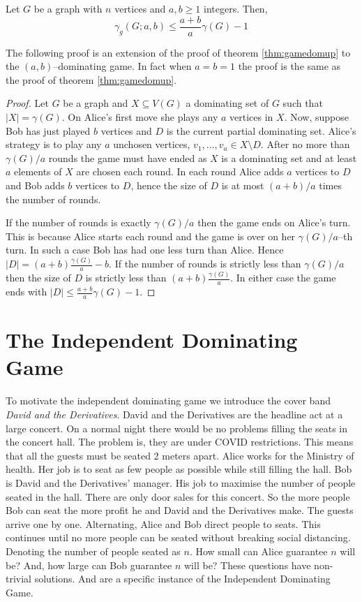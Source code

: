 \begin{theorem}[Askes] 
    Let $G$ be a graph with $n$ vertices and $a,b\geq1$ integers. Then,
    \[\gamma_{g}(G;a,b) \leq \frac{a+b}{a}\gamma(G) - 1\]
\end{theorem}
    The following proof is an extension of the proof of theorem \ref{thm:gamedomup} to the $(a,b)$--dominating game. In fact when $a=b=1$ the proof is the same as the proof of theorem \ref{thm:gamedomup}.
\begin{proof}    
   Let $G$ be a graph and $X\subseteq V(G)$ a dominating set of $G$ such that $|X| = \gamma(G)$. On Alice's first move she plays any $a$ vertices in $X$. Now, suppose Bob has just played $b$ vertices and $D$ is the current partial dominating set. Alice's strategy is to play any $a$ unchosen vertices, $v_1,\dots,v_a \in X\setminus D$. After no more than $\gamma(G)/a$ rounds the game must have ended as $X$ is a dominating set and at least $a$ elements of $X$ are chosen each round. In each round Alice adds $a$ vertices to $D$ and Bob adds $b$ vertices to $D$, hence the size of $D$ is at most $(a+b)/a$ times the number of rounds. 
   
   If the number of rounds is exactly $\gamma(G)/a$ then the game ends on Alice's turn. This is because Alice starts each round and the game is over on her $\gamma(G)/a$--th turn. In such a case Bob has had one less turn than Alice. Hence $|D|=(a+b)\frac{\gamma(G)}{a} -b$. If the number of rounds is strictly less than $\gamma(G)/a$ then the size of $D$ is strictly less than $(a+b)\frac{\gamma(G)}{a}$. In either case the game ends with $|D| \leq \frac{a+b}{a}\gamma(G) - 1$.
\end{proof}

\section{The Independent Dominating Game} \label{sec:ind_dom_game}

To motivate the independent dominating game we introduce the cover band \textit{David and the Derivatives}. David and the Derivatives are the headline act at a large concert. On a normal night there would be no problems filling the seats in the concert hall. The problem is, they are under COVID restrictions. This means that all the guests must be seated 2 meters apart. Alice works for the Ministry of health. Her job is to seat as few people as possible while still filling the hall. Bob is David and the Derivatives' manager. His job to maximise the number of people seated in the hall. There are only door sales for this concert. So the more people Bob can seat the more profit he and David and the Derivatives make. The guests arrive one by one. Alternating, Alice and Bob direct people to seats. This continues until no more people can be seated without breaking social distancing. Denoting the number of people seated as $n$. How small can Alice guarantee $n$ will be? And, how large can Bob guarantee $n$ will be? These questions have non-trivial solutions. And are a specific instance of the Independent Dominating Game.

